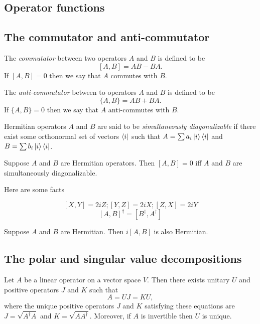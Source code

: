 \documentclass{article}
\begin{document}
\subsection{Operator functions}
\subsection{The commutator and anti-commutator}
\begin{definition}[Commutator]
  The \textit{commutator} between two operators $A$ and $B$ is defined to be
  \[[A,B]=AB-BA.\]
  If $[A,B]=0$ then we say that $A$ commutes with $B$.
\end{definition}
\begin{definition}
  The \textit{anti-commutator} between to operators $A$ and $B$ is defined to be
  \[\{A,B\}=AB+BA.\]
  If $\{A,B\}=0$ then we say that $A$ anti-commutes with $B$.
\end{definition}

\begin{definition}
  Hermitian operators $A$ and $B$ are said to be \textit{simultaneously diagonalizable} if there exist some orthonormal set of vectors $\bra{i}$ such that $A=\sum a_i\ket{i}\bra{i}$ and $B=\sum b_i\ket{i}\bra{i}$.
\end{definition}

\begin{theorem}
  Suppose $A$ and $B$ are Hermitian operators. Then $[A,B]=0$ iff $A$ and $B$ are simultaneously diagonalizable.
\end{theorem}

Here are some facts

\[
  [X,Y]=2iZ; [Y,Z]=2iX; [Z,X]=2iY
\]
\[
  [A,B]^\dagger = [B^\dagger, A^\dagger]
\]

\begin{theorem}
  Suppose $A$ and $B$ are Hermitian. Then $i[A,B]$ is also Hermitian.
\end{theorem}
\subsection{The polar and singular value decompositions}

\begin{theorem}
  Let $A$ be a linear operator on a vector space $V$. Then
  there exists unitary $U$ and positive operators $J$ and $K$
  such that
  \[A=UJ=KU,\]
  where the unique positive operators $J$ and $K$ satisfying
  these equations are $J=\sqrt{A^\dagger A}$ and $K=\sqrt{AA^\dagger}$.
  Moreover, if $A$ is invertible then $U$ is unique.
\end{theorem}
\end{document}
